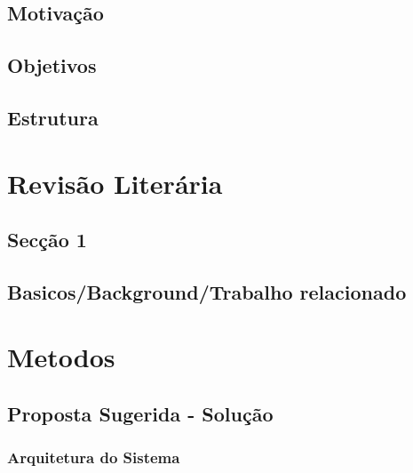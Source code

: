\documentclass[a4paper]{report}
\begin{document}
        \section{Motivação}
        
        \section{Objetivos}
        
        \section{Estrutura}
        


	\chapter{Revisão Literária}
        
        
        \section{Secção 1}

        
        \section{Basicos/Background/Trabalho relacionado}

	\chapter{Metodos}

	\section{Proposta Sugerida - Solução}
     \subsection{Arquitetura do Sistema}

	
\end{document}
